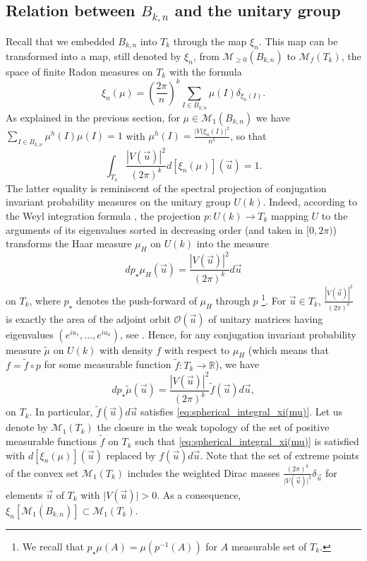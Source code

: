 \documentclass[10pt,11pt]{amsart}%
\begin{document}
\subsection{Relation between $B_{k,n}$ and the unitary group}
Recall that we embedded $B_{k,n}$ into $T_k$ through the map $\xi_n$. This map can be transformed into a map, still denoted by $\xi_n$, from $\mathcal{M}_{\geq 0}(B_{k,n})$ to $\mathcal{M}_f( T_{k})$, the space of finite Radon measures on $ T_{k}$ with the formula
$$\xi_n(\mu)=\left(\frac{2\pi}{n}\right)^k\sum_{I\in B_{k,n}}\mu(I)\delta_{\xi_n(I)}.$$
As explained in the previous section, for $\mu\in\mathcal{M}_{1}(B_{k,n})$ we have $\sum_{I\in B_{k,n}}\mu^h(I)\mu(I)=1$ with $\mu^h(I)=\frac{\vert V(\xi_n(I)\vert^2}{n^k}$, so that 
\begin{equation}\label{eq:spherical_integral_xi(mu)}
\int_{ T_{k}}\frac{\left\vert V\left(\vec{u}\right)\right\vert^2}{(2\pi)^k}d\left[\xi_n(\mu)\right](\vec{u})=1.
\end{equation}
The latter equality is reminiscent of the spectral projection of conjugation invariant probability measures on the unitary group $U(k)$. Indeed, according to the Weyl integration formula \cite[Section 4]{AGZ}, the projection $p:U(k)\rightarrow  T_{k}$ mapping $U$ to the arguments of its eigenvalues sorted in decreasing order (and taken in $[0,2\pi)$) transforms the Haar measure $\mu_H$ on $U(k)$ into the measure 
$$dp_{\star}\mu_H(\vec{u})=\frac{\left\vert V\left(\vec{u}\right)\right\vert^2}{(2\pi)^k}d\vec{u}$$
on $ T_{k}$, where $p_{\star}$ denotes the push-forward of $\mu_H$ through $p$ \footnote{We recall that $p_{\star}\mu(A)=\mu(p^{-1}(A))$ for $A$ measurable set of $T_k$.}. For $\vec{u}\in  T_{k}$, $\frac{\left\vert V\left(\vec{u}\right)\right\vert^2}{(2\pi)^k}$ is exactly the area of the adjoint orbit $\mathcal{O}(\vec{u})$ of unitary matrices having eigenvalues $\left(e^{i u_1},\ldots,e^{iu_k}\right)$, see \cite[Section 4.1, Eq. (4.1.17)]{AGZ}. Hence, for any conjugation invariant probability measure $\tilde{\mu}$ on $U(k)$ with density $f$ with respect to $\mu_H$ (which means that $f=\tilde{f}\circ p$ for some measurable function $\tilde{f}:T_k\rightarrow \mathbb{R}$), we have 
$$dp_{\star}\tilde{\mu}(\vec{u})=\frac{\left\vert V\left(\vec{u}\right)\right\vert^2}{(2\pi)^k} \tilde{f}(\vec{u})d\vec{u},$$
on $T_k$. In particular, $\tilde{f}(\vec{u})d\vec{u}$ satisfies \eqref{eq:spherical_integral_xi(mu)}. Let us denote by $\mathcal{M}_1( T_{k})$ the closure in the weak topology of the set of positive measurable functions $\tilde{f}$ on $T_k$ such that \eqref{eq:spherical_integral_xi(mu)} is satisfied with $d\left[\xi_n(\mu)\right](\vec{u})$ replaced by $f(\vec{u})d\vec{u}$. Note that the set of extreme points of the convex set $\mathcal{M}_1( T_{k})$ includes the weighted Dirac masses $\frac{(2\pi)^k}{\vert V(\vec{u})\vert^2}\delta_{\vec{u}}$ for elements $\vec{u}$ of $T_k$ with $\vert V(\vec{u})\vert>0$. As a consequence, $\xi_n\left[\mathcal{M}_{1}(B_{k,n})\right]\subset\mathcal{M}_1(T_k)$.
\end{document}
